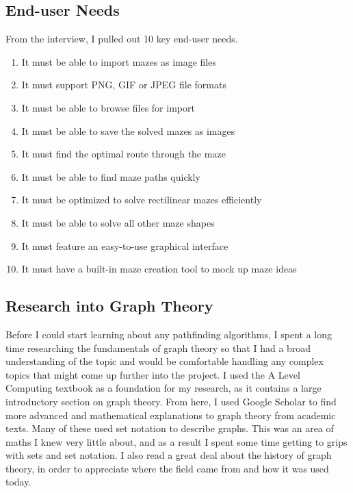 \documentclass[titlepage]{article}
\begin{document}
\subsection{End-user Needs}
From the interview, I pulled out 10 key end-user needs.
\begin{enumerate} [{Need }1:]
\item It must be able to import mazes as image files
\item It must support PNG, GIF or JPEG file formats
\item It must be able to browse files for import
\item It must be able to save the solved mazes as images 
\item It must find the optimal route through the maze
\item It must be able to find maze paths quickly
\item It must be optimized to solve rectilinear mazes efficiently
\item It must be able to solve all other maze shapes
\item It must feature an easy-to-use graphical interface
\item It must have a built-in maze creation tool to mock up maze ideas
\end{enumerate}


\subsection{Research into Graph Theory}
Before I could start learning about any pathfinding algorithms, I spent a long time researching the fundamentals of graph theory so that I had a broad understanding of the topic and would be comfortable handling any complex topics that might come up further into the project. I used the A Level Computing textbook as a foundation for my research, as it contains a large introductory section on graph theory. From here, I used Google Scholar to find more advanced and mathematical explanations to graph theory from academic texts. Many of these used set notation to describe graphs. This was an area of maths I knew very little about, and as a result I spent some time getting to grips with sets and set notation. I also read a great deal about the history of graph theory, in order to appreciate where the field came from and how it was used today. 
\end{document}
